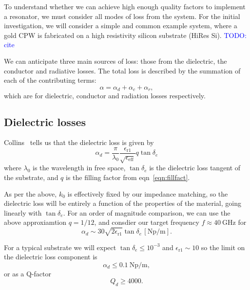 \documentclass[a4paper]{article}
\newcommand{\cm}[1]{\textcolor{blue}{#1}} %
\begin{document}
To understand whether we can achieve high enough quality factors to implement a
resonator, we must consider all modes of loss from the system. For the initial
investigation, we will consider a simple and common example system, where a gold
CPW is fabricated on a high resistivity silicon substrate (HiRes Si). \cm{TODO:
cite}

We can anticipate three main sources of loss: those from the dielectric, the
conductor and radiative losses. \cite{Simons2004} The total loss is described
by the summation of each of the contributing terms:
\begin{equation}
  \alpha = \alpha_d + \alpha_c + \alpha_r,
\end{equation}
which are for dielectric, conductor and radiation losses respectively.

\subsection{Dielectric losses}

Collins~\cite{Collin2007} tells us that the dielectric loss is given by
\begin{equation}
  \alpha_d =
  \frac{\pi}{\lambda_0}\frac{\epsilon_\mathrm{r1}}{\sqrt{\epsilon_\mathrm{eff}}}
  q \tan \delta_e
\end{equation}
where $\lambda_0$ is the wavelength in free space, $\tan \delta_e$ is the
dielectric loss tangent of the substrate, and $q$ is the filling factor from
eqn~\ref{eqn:fillfact}.

As per the above, $k_0$ is effectively fixed by our impedance matching, so the
dielectric loss will be entirely a function of the properties of the material,
going linearly with $\tan\delta_e$. For an order of magnitude comparison, we can
use the above approxiamtion $q=1/12$, and consdier our target frequency
$f\approx\SI{40}{\giga\hertz}$ for
\begin{equation}
  \alpha_d \sim 30\sqrt{2\epsilon_\mathrm{r1}}\tan\delta_e
  \,[\si{\neper\per\meter}].
\end{equation}

For a typical substrate we will expect $\tan\delta_e\leq10^{-3}$ and
$\epsilon_\mathrm{r1} \sim 10$ so the limit on the dielectric loss component is
\begin{equation}
  \alpha_d \leq \SI{0.1}{\neper\per\meter},
\end{equation}
or as a Q-factor
\begin{equation}
  Q_d \geq 4000.
\end{equation}
\end{document}
